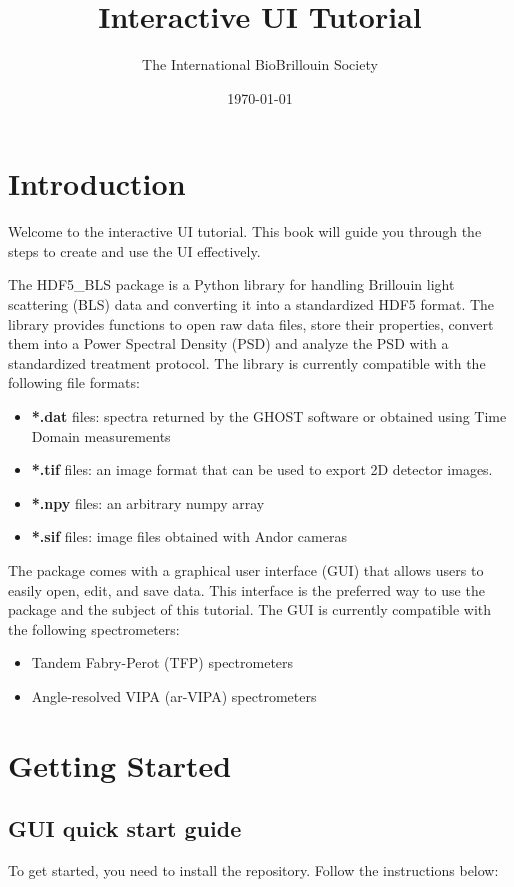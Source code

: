 \documentclass{book}
\title{Interactive UI Tutorial}
\author{The International BioBrillouin Society}
\date{\today}
\begin{document}
\maketitle

\tableofcontents

\chapter{Introduction}
Welcome to the interactive UI tutorial. This book will guide you through the steps to create and use the UI effectively.

The HDF5\_BLS package is a Python library for handling Brillouin light scattering (BLS) data and converting it into a standardized HDF5 format. The library provides functions to open raw data files, store their properties, convert them into a Power Spectral Density (PSD) and analyze the PSD with a standardized treatment protocol. The library is currently compatible with the following file formats:
\begin{itemize}
    \item \textbf{*.dat} files: spectra returned by the GHOST software or obtained using Time Domain measurements
    \item \textbf{*.tif} files: an image format that can be used to export 2D detector images.
    \item \textbf{*.npy} files: an arbitrary numpy array
    \item \textbf{*.sif} files: image files obtained with Andor cameras
\end{itemize}

The package comes with a graphical user interface (GUI) that allows users to easily open, edit, and save data. This interface is the preferred way to use the package and the subject of this tutorial. The GUI is currently compatible with the following spectrometers:
\begin{itemize}
    \item Tandem Fabry-Perot (TFP) spectrometers
    \item Angle-resolved VIPA (ar-VIPA) spectrometers 
\end{itemize}

\chapter{Getting Started}
    \section{GUI quick start guide}
        To get started, you need to install the repository. Follow the instructions below:
\end{document}
